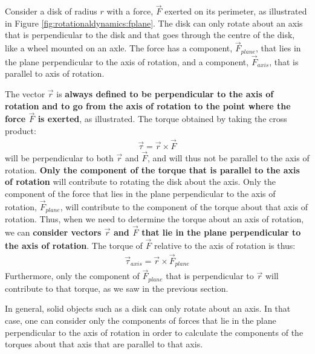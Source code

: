 Consider a disk of radius $r$ with a force, $\vec F$ exerted on its perimeter, as illustrated in Figure \ref{fig:rotationaldynamics:fplane}. The disk can only rotate about an axis that is perpendicular to the disk and that goes through the centre of the disk, like a wheel mounted on an axle. The force has a component, $\vec F_{plane}$, that lies in the plane perpendicular to the axis of rotation, and a component, $\vec F_{axis}$, that is parallel to axis of rotation.

The vector $\vec r$ is  \textbf{always defined to be perpendicular to the axis of rotation and to go from the axis of rotation to the point where the force $\vec F$ is exerted}, as illustrated. The torque obtained by taking the cross product:
\begin{align*}
\vec \tau = \vec r \times \vec F
\end{align*}
will be perpendicular to both $\vec r$ and $\vec F$, and will thus not be parallel to the axis of rotation. \textbf{Only the component of the torque that is parallel to the axis of rotation} will contribute to rotating the disk about the axis. Only the component of the force that lies in the plane perpendicular to the axis of rotation, $\vec F_{plane}$, will contribute to the component of the torque about that axis of rotation. Thus, when we need to determine the torque about an axis of rotation, we can \textbf{consider vectors $\vec r$ and $\vec F$ that lie in the plane perpendicular to the axis of rotation}. The torque of $\vec F$ relative to the axis of rotation is thus:
\begin{align*}
\vec \tau_{axis} = \vec r \times \vec F_{plane}
\end{align*}
Furthermore, only the component of $\vec F_{plane}$ that is perpendicular to $\vec r$ will contribute to that torque, as we saw in the previous section. 

In general, solid objects such as a disk can only rotate about an axis. In that case, one can consider only the components of forces that lie in the plane perpendicular to the axis of rotation in order to calculate the components of the torques about that axis that are parallel to that axis. 

